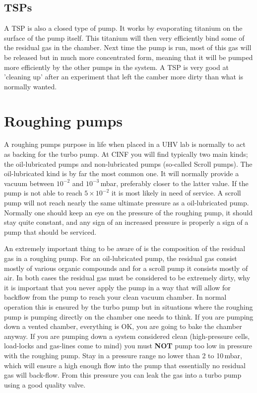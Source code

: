 \documentclass[a4paper,english]{article}
\begin{document}
\subsection{TSPs}
A TSP is also a closed type of pump. It works by evaporating titanium on the surface of the pump itself. This titanium will then very efficiently bind some of the residual gas in the chamber. Next time the pump is run, most of this gas will be released but in much more concentrated form, meaning that it will be pumped more efficiently by the other pumps in the system. A TSP is very good at 'cleaning up' after an experiment that left the camber more dirty than what is normally wanted.

\section{Roughing pumps}
A roughing pumps purpose in life when placed in a UHV lab is normally to act as backing for the turbo pump. At CINF you will find typically two main kinds; the oil-lubricated pumps and non-lubricated pumps (so-called Scroll pumps). The oil-lubricated kind is by far the most common one. It will normally provide a vacuum between $10^{-2}$ and $10^{-3}$\,mbar, preferably closer to the latter value. If the pump is not able to reach $5\times10^{-2}$ it is most likely in need of service. A scroll pump will not reach nearly the same ultimate pressure as a oil-lubricated pump. Normally one should keep an eye on the pressure of the roughing pump, it should stay quite constant, and any sign of an increased pressure is properly a sign of a pump that should be serviced.

An extremely important thing to be aware of is the composition of the residual gas in a roughing pump. For an oil-lubricated pump, the residual gas consist mostly of various organic compounds and for a scroll pump it consists mostly of air. In both cases the residual gas must be considered to be extremely dirty, why it is important that you never apply the pump in a way that will allow for backflow from the pump to reach your clean vacuum chamber. In normal operation this is ensured by the turbo pump but in situations where the roughing pump is pumping directly on the chamber one needs to think. If you are pumping down a vented chamber, everything is OK, you are going to bake the chamber anyway. If you are pumping down a system considered clean (high-pressure cells, load-locks and gas-lines come to mind) you must \textbf{NOT} pump too low in pressure with the roughing pump. Stay in a pressure range no lower than 2 to 10\,mbar, which will ensure a high enough flow into the pump that essentially no residual gas will back-flow. From this pressure you can leak the gas into a turbo pump using a good quality valve.
\end{document}
